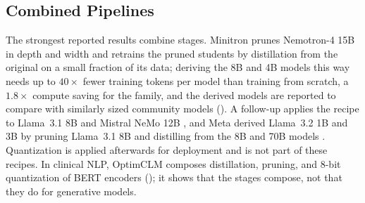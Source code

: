 \subsection{Combined Pipelines}
\label{subsec:compression_combined}

The strongest reported results combine stages. Minitron \citep{minitron2024} prunes Nemotron-4 15B in depth and width and retrains the pruned students by distillation from the original on a small fraction of its data; deriving the 8B and 4B models this way needs up to $40\times$ fewer training tokens per model than training from scratch, a $1.8\times$ compute saving for the family, and the derived models are reported to compare with similarly sized community models (\evC). A follow-up applies the recipe to Llama~3.1 8B and Mistral NeMo 12B \citep{sreenivas2024llmpruning}, and Meta derived Llama~3.2 1B and 3B by pruning Llama~3.1 8B and distilling from the 8B and 70B models \citep{meta2024llama32}. Quantization is applied afterwards for deployment and is not part of these recipes. In clinical NLP, OptimCLM \citep{hasan2024optimclm} composes distillation, pruning, and 8-bit quantization of BERT encoders (\evC); it shows that the stages compose, not that they do for generative models.
